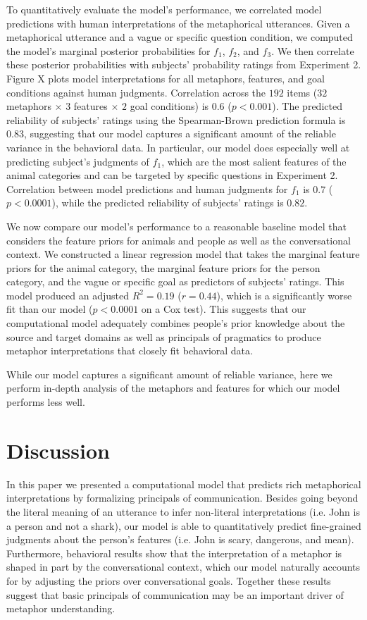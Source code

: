 \documentclass[10pt,letterpaper]{article}
\begin{document}
To quantitatively evaluate the model's performance, we correlated model predictions with human interpretations of the metaphorical utterances. Given a metaphorical utterance and a vague or specific question condition, we computed the model's marginal posterior probabilities for $f_1$, $f_2$, and $f_3$. We then correlate these posterior probabilities with subjects' probability ratings from Experiment 2. Figure X plots model interpretations for all metaphors, features, and goal conditions against human judgments. Correlation across the $192$ items ($32$ metaphors $\times$ $3$ features $\times$ $2$ goal conditions) is $0.6$ ($p < 0.001$). The predicted reliability of subjects' ratings using the Spearman-Brown prediction formula is $0.83$, suggesting that our model captures a significant amount of the reliable variance in the behavioral data. In particular, our model does especially well at predicting subject's judgments of $f_1$, which are the most salient features of the animal categories and can be targeted by specific questions in Experiment 2. Correlation between model predictions and human judgments for $f_1$ is $0.7$ ($p < 0.0001$), while the predicted reliability of subjects' ratings is  $0.82$. 

We now compare our model's performance to a reasonable baseline model that considers the feature priors for animals and people as well as the conversational context. We constructed a linear regression model that takes the marginal feature priors for the animal category, the marginal feature priors for the person category, and the vague or specific goal as predictors of subjects' ratings. This model produced an adjusted $R^2 = 0.19$ ($r = 0.44$), which is a significantly worse fit than our model ($p < 0.0001$ on a Cox test). This suggests that our computational model adequately combines people's prior knowledge about the source and target domains as well as principals of pragmatics to produce metaphor interpretations that closely fit behavioral data. 

While our model captures a significant amount of reliable variance, here we perform in-depth analysis of the metaphors and features for which our model performs less well.

\section{Discussion}
In this paper we presented a computational model that predicts rich metaphorical interpretations by formalizing principals of communication. Besides going beyond the literal meaning of an utterance to infer non-literal interpretations (i.e. John is a person and not a shark), our model is able to quantitatively predict fine-grained judgments about the person's features (i.e. John is scary, dangerous, and mean). Furthermore, behavioral results show that the interpretation of a metaphor is shaped in part by the conversational context, which our model naturally accounts for by adjusting the priors over conversational goals. Together these results suggest that basic principals of communication may be an important driver of metaphor understanding.
\end{document}
